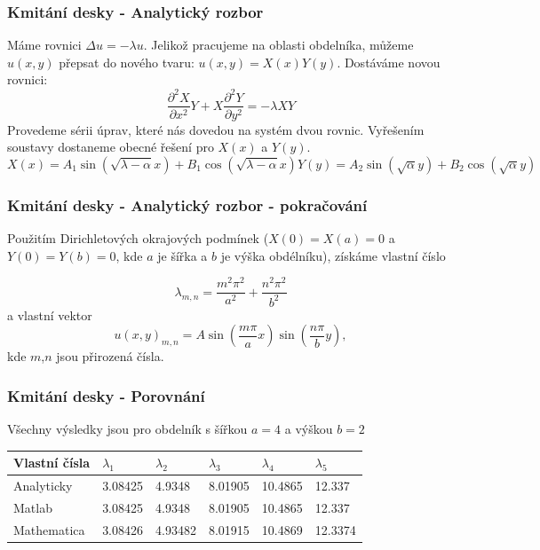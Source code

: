\documentclass[xcolor=table]{beamer}
\begin{document}
\begin{frame}
\frametitle{Kmitání desky - Analytický rozbor}
\pause
Máme rovnici $\Delta u=-\lambda u$. Jelikož pracujeme na oblasti obdelníka, můžeme $u(x,y)$ přepsat do nového tvaru: $u(x,y)=X(x) Y(y)$.
\pause
Dostáváme novou rovnici:
\begin{equation}
   \frac{\partial^2 X}{\partial x^2} Y
      + X \frac{\partial^2 Y}{\partial y^2}=-\lambda X Y
\end{equation}
\pause
Provedeme sérii úprav, které nás dovedou na systém dvou rovnic. Vyřešením soustavy dostaneme obecné řešení pro $X(x)$ a $Y(y)$.
\pause
\begin{subequations} 
\begin{equation}
X(x)=A_1 \sin{(\sqrt{\lambda-\alpha}x)}+B_1 \cos{(\sqrt{\lambda-\alpha}x)}
\end{equation}
\begin{equation}
Y(y)=A_2 \sin{(\sqrt{\alpha}y)}+B_2 \cos{(\sqrt{\alpha}y)}
\end{equation}
\end{subequations}

\end{frame}

\begin{frame}
\frametitle{Kmitání desky - Analytický rozbor - pokračování}
Použitím Dirichletových okrajových podmínek ($X(0)=X(a)=0$ a $Y(0)=Y(b)=0$, kde $a$ je šířka a $b$ je výška obdélníku), získáme vlastní číslo

\begin{equation}
\lambda_{m,n}=\frac{m^2\pi^2}{a^2}+\frac{n^2\pi^2}{b^2}
\end{equation}
\pause
a vlastní vektor
\begin{equation}
u(x,y)_{m,n}=A\sin{(\frac{m\pi}{a}x)}\sin{(\frac{n\pi}{b}y)},
\end{equation}
kde $m$,$n$ jsou přirozená čísla.
\end{frame}

\begin{frame}
\frametitle{Kmitání desky - Porovnání}
Všechny výsledky jsou pro obdelník s šířkou $a=4$ a výškou $b=2$

\begin{table}[]
\begin{tabular}{|llllll|}
\hline
\rowcolor[HTML]{EFEFEF} 
\cellcolor[HTML]{C0C0C0}Vlastní čísla & $\lambda_1$      & $\lambda_2$        & $\lambda_3$    & $\lambda_4$    & $\lambda_5$     \\ \hline
\rowcolor[HTML]{CBCEFB} 
\cellcolor[HTML]{9698ED}Analyticky    & 3.08425 & 4.9348  & 8.01905 & 10.4865 & 12.337  \\ \hline
\rowcolor[HTML]{FFCE93} 
\cellcolor[HTML]{FE996B}Matlab        & 3.08425  & 4.9348  & 8.01905  & 10.4865 & 12.337  \\ \hline
\rowcolor[HTML]{FFCCC9} 
\cellcolor[HTML]{FD6864}Mathematica   & 3.08426 & 4.93482 & 8.01915 & 10.4869 & 12.3374 \\ \hline
\end{tabular}
\end{table}

\end{frame}
\end{document}
